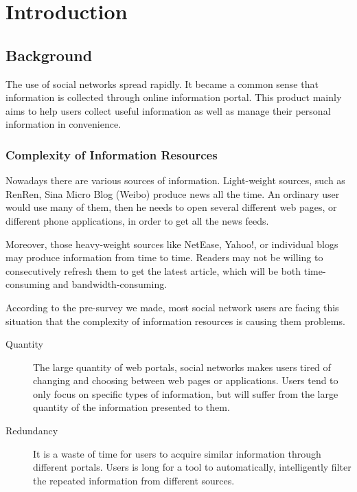 
\section{Introduction}
\subsection{Background}
The use of social networks spread rapidly.
It became a common sense that information is collected through online information portal.
This product mainly aims to help users collect useful information
as well as manage their personal information in convenience.

\subsubsection{Complexity of Information Resources}

    Nowadays there are various sources of information.
    Light-weight sources, such as RenRen, Sina Micro Blog (Weibo) produce
    news all the time. An ordinary user would use many of them,
    then he needs to open several different web pages, or different phone applications,
    in order to get all the news feeds.

    Moreover, those heavy-weight sources like NetEase, Yahoo!,
    or individual blogs may produce information from time to time.
    Readers may not be willing to consecutively refresh them to get the latest article,
    which will be both time-consuming and bandwidth-consuming.

    According to the pre-survey we made,
    most social network users are facing this situation that the complexity
    of information resources is causing them problems.

\begin{description}
  \item[Quantity] \hfill

    The large quantity of web portals,
    social networks makes users tired of changing and choosing between web pages or applications.
    Users tend to only focus on specific types of information, but will suffer from the large quantity of
    the information presented to them.

  \item[Redundancy] \hfill

   It is a waste of time for users to acquire similar information through different portals.
   Users is long for a tool to automatically, intelligently filter the repeated information from different
   sources.

\end{description}


